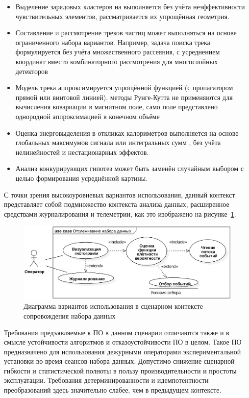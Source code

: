 \begin{itemize}
    \item Выделение зарядовых кластеров на выполняется без учёта
    неэффективности чувствительных элементов, рассматривается
    их упрощённая геометрия.
    \item Составление и рассмотрение треков частиц может выполняться
    на основе ограниченного набора вариантов. Например, задача поиска
    трека формулируется без учёта множественного рассеяния, с
    усреднением координат вместо комбинаторного рассмотрения для
    многослойных детекторов
    \item Модель трека аппроксимируется упрощённой функцией
    (с пропагатором прямой или винтовой линией),
    методы Рунге-Кутта не применяются для вычисления ковариации
    в магнитном поле, само поле представлено однородной аппроксимацией
    в конечном объёме
    \item Оценка энерговыделения в откликах калориметров выполняется
    на основе глобальных максимумов сигнала или интегральных сумм ,
    без учёта нелинейностей и нестационарных
    эффектов.
    \item Анализ конкурирующих гипотез может быть заменён случайным
    выбором с целью формирования усреднённой картины.
\end{itemize}

С точки зрения высокоуровневых вариантов использования, данный контекст
представляет собой подмножество контекста анализа данных,
расширенное средствами журналирования и телеметрии, как это изображено
на рисунке~\ref{fig:online-monitoring-usecases-main}.

\begin{figure}[ht!]
    \centering
    \includegraphics[width=0.95\linewidth]{images/usecases/onlineMonitoring.eps}
    \caption{Диаграмма вариантов использования в сценарном контексте сопровождения набора данных}
    \label{fig:online-monitoring-usecases-main}
\end{figure}

Требования предъявляемые к ПО в данном сценарии отличаются также
и в смысле устойчивости алгоритмов и отказоустойчивости ПО в целом.
Такое ПО предназначено для использования дежурными операторами
экспериментальной установки во время сеансов набора данных. Допустимо
снижение сценарной гибкости и статистической полноты в пользу
производительности и простоты эксплуатации. Требования
детерминированности и идемпотентности преобразований здесь
значительно слабее, чем в предыдущем контексте.

